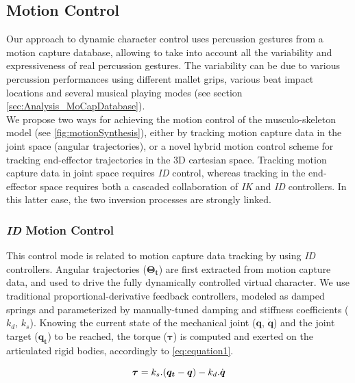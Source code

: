		\subsection{Motion Control}
		\label{subsec:Synthesis_Physics_MotionControl}

Our approach to dynamic character control uses percussion gestures from a motion capture database, allowing to take into account all the variability and expressiveness of real percussion gestures. The variability can be due to various percussion performances using different mallet grips, various beat impact locations and several musical playing modes (see section \ref{sec:Analysis_MoCapDatabase}).\\

We propose two ways for achieving the motion control of the musculo-skeleton model (see \myfigname \ref{fig:motionSynthesis}), either by tracking motion capture data in the joint space (angular trajectories), or a novel hybrid motion control scheme for tracking end-effector trajectories in the 3D cartesian space. Tracking motion capture data in joint space requires \emph{ID} control, whereas tracking in the end-effector space requires both a cascaded collaboration of \emph{IK} and \emph{ID} controllers. In this latter case, the two inversion processes are strongly linked. 


			\subsubsection{\emph{ID} Motion Control}
			\label{subsec:Synthesis_Physics_MotionControl_InverseDynamics}

This control mode is related to motion capture data tracking by using \emph{ID} controllers. Angular trajectories ($\boldsymbol{\Theta_t}$) are first extracted from motion capture data, and used to drive the fully dynamically controlled virtual character. We use traditional proportional-derivative feedback controllers, modeled as damped springs and parameterized by manually-tuned damping and stiffness coefficients ($k_d$, $k_s$). Knowing the current state of the mechanical joint ($\boldsymbol{q}$, $\dot{\boldsymbol{q}}$) and the joint target ($\boldsymbol{q_t}$) to be reached, the torque ($\boldsymbol{\tau}$) is computed and exerted on the articulated rigid bodies, accordingly to \myequname \eqref{eq:equation1}.

\begin{equation}
	\boldsymbol{\tau} = k_s . (\boldsymbol{q_t} - \boldsymbol{q}) -  k_d . \dot{\boldsymbol{q}}
\label{eq:equation1}
\eqcaption{\emph{ID} control involved in the hybrid motion control}
\end{equation}

